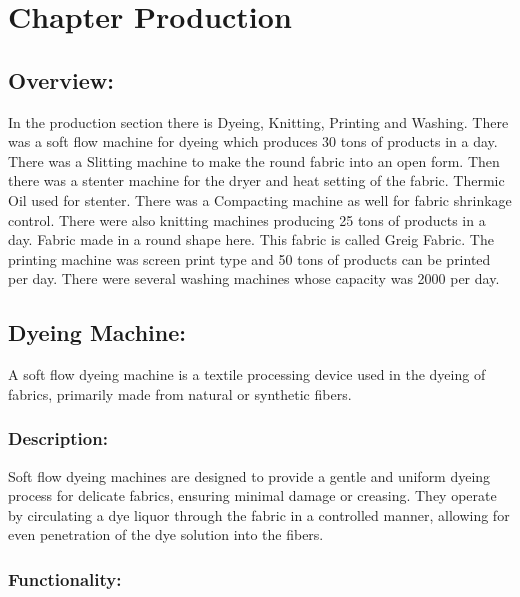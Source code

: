 \section{Chapter Production}

\subsection{Overview:}

In the production section there is Dyeing, Knitting, Printing and Washing. There
was a soft flow machine for dyeing which produces 30 tons of products in
a day. There was a Slitting machine to make the round fabric into an
open form. Then there was a stenter machine for the dryer and heat
setting of the fabric. Thermic Oil used for stenter. There was a
Compacting machine as well for fabric shrinkage control. There were also
knitting machines producing 25 tons of products in a day. Fabric made in
a round shape here. This fabric is called Greig Fabric. The printing
machine was screen print type and 50 tons of products can be printed per
day. There were several washing machines whose capacity was 2000 per
day.


\subsection{Dyeing Machine:}

A soft flow dyeing machine is a textile processing device used in the
dyeing of fabrics, primarily made from natural or synthetic fibers.

\subsubsection{Description:}


Soft flow dyeing machines are designed to provide a gentle and uniform
dyeing process for delicate fabrics, ensuring minimal damage or
creasing. They operate by circulating a dye liquor through the fabric in
a controlled manner, allowing for even penetration of the dye solution
into the fibers.


\subsubsection{Functionality:}

